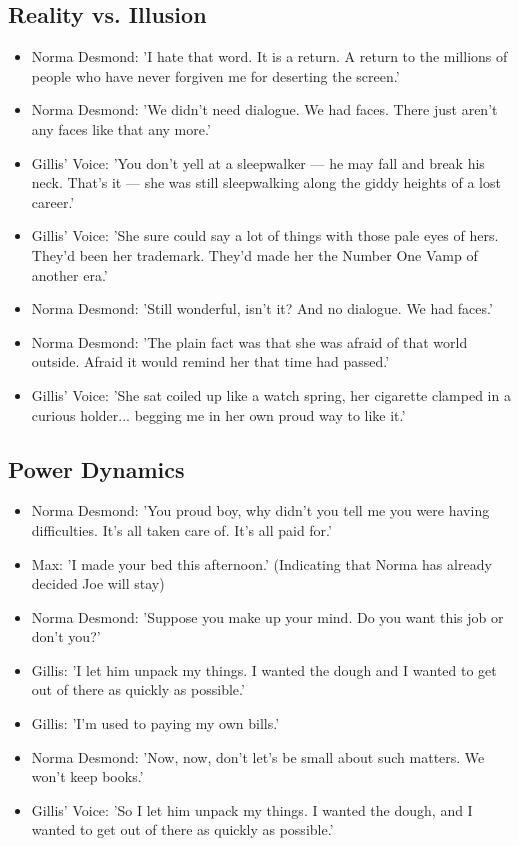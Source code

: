 \documentclass[a4paper]{article}
\begin{document}
\subsection{Reality vs. Illusion}
\begin{itemize}
  \item Norma Desmond: 'I hate that word. It is a return. A return to the millions of people who have never forgiven me for deserting the screen.'
  \item Norma Desmond: 'We didn't need dialogue. We had faces. There just aren't any faces like that any more.'
  \item Gillis' Voice: 'You don't yell at a sleepwalker — he may fall and break his neck. That's it — she was still sleepwalking along the giddy heights of a lost career.'
  \item Gillis' Voice: 'She sure could say a lot of things with those pale eyes of hers. They’d been her trademark. They’d made her the Number One Vamp of another era.'
  \item Norma Desmond: 'Still wonderful, isn't it? And no dialogue. We had faces.'
  \item Norma Desmond: 'The plain fact was that she was afraid of that world outside. Afraid it would remind her that time had passed.'
  \item Gillis' Voice: 'She sat coiled up like a watch spring, her cigarette clamped in a curious holder... begging me in her own proud way to like it.'\\
\end{itemize}

\subsection{Power Dynamics}
\begin{itemize}
  \item Norma Desmond: 'You proud boy, why didn't you tell me you were having difficulties. It's all taken care of. It's all paid for.'
  \item Max: 'I made your bed this afternoon.' (Indicating that Norma has already decided Joe will stay)
  \item Norma Desmond: 'Suppose you make up your mind. Do you want this job or don't you?'
  \item Gillis: 'I let him unpack my things. I wanted the dough and I wanted to get out of there as quickly as possible.'
  \item Gillis: 'I’m used to paying my own bills.'
  \item Norma Desmond: 'Now, now, don't let's be small about such matters. We won't keep books.'
  \item Gillis' Voice: 'So I let him unpack my things. I wanted the dough, and I wanted to get out of there as quickly as possible.'\\
\end{itemize}
\end{document}
